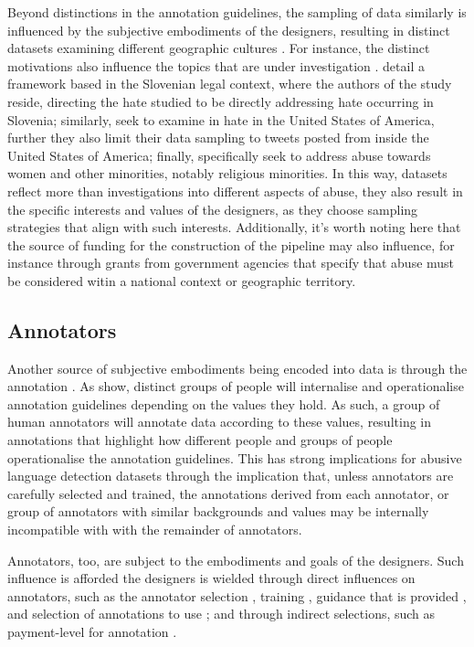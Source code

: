 Beyond distinctions in the annotation guidelines, the sampling of data similarly is influenced by the subjective embodiments of the designers, resulting in distinct datasets examining different geographic cultures \citep{Waseem:2018}. For instance, the distinct motivations also influence the topics that are under investigation \citep{Waseem:2018}. \citet{Fiser:2017} detail a framework based in the Slovenian legal context, where the authors of the study reside, directing the hate studied to be directly addressing hate occurring in Slovenia; similarly, \citet{Davidson:2017} seek to examine in hate in the United States of America, further they also limit their data sampling to tweets posted from inside the United States of America; finally, \citet{Waseem-Hovy:2016} specifically seek to address abuse towards women and other minorities, notably religious minorities.
In this way, datasets reflect more than investigations into different aspects of abuse, they also result in the specific interests and values of the designers, as they choose sampling strategies that align with such interests. Additionally, it's worth noting here that the source of funding for the construction of the pipeline may also influence, for instance through grants from government agencies that specify that abuse must be considered witin a national context or geographic territory.

\subsection{Annotators}

Another source of subjective embodiments being encoded into data is through the annotation \citep{Waseem:2016}. As \citet{Waseem:2016} show, distinct groups of people will internalise and operationalise annotation guidelines depending on the values they hold. As such, a group of human annotators will annotate data according to these values, resulting in annotations that highlight how different people and groups of people operationalise the annotation guidelines. This has strong implications for abusive language detection datasets through the implication that, unless annotators are carefully selected and trained, the annotations derived from each annotator, or group of annotators with similar backgrounds and values  may be internally incompatible with with the remainder of annotators.

Annotators, too, are subject to the embodiments and goals of the designers. Such influence is afforded the designers is wielded through direct influences on annotators, such as the annotator selection \citep{Waseem:2016}, training \citep{Vidgen:2020}, guidance that is provided \citep{Palmer:2020}, and selection of annotations to use \cite{Hovy:2013}; and through indirect selections, such as payment-level for annotation \citep{Sabou:2014}.

